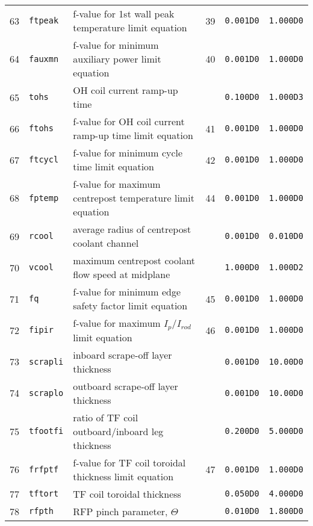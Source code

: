 \documentclass[11pt,a4paper]{report}
\begin{document}
\begin{table}[tbph]
\begin{center}
\begin{tabular}{||c|l|l|c|c|c||}
63  & \texttt{ftpeak}   & f-value for 1st wall peak temperature limit equation    & 39  & \texttt{0.001D0} & \texttt{1.000D0} \\
64  & \texttt{fauxmn}   & f-value for minimum auxiliary power limit equation      & 40  & \texttt{0.001D0} & \texttt{1.000D0} \\
65  & \texttt{tohs}     & OH coil current ramp-up time                            &     & \texttt{0.100D0} & \texttt{1.000D3} \\
66  & \texttt{ftohs}    & f-value for OH coil current ramp-up time limit equation & 41  & \texttt{0.001D0} & \texttt{1.000D0} \\
67  & \texttt{ftcycl}   & f-value for minimum cycle time limit equation           & 42  & \texttt{0.001D0} & \texttt{1.000D0} \\
68  & \texttt{fptemp}   & f-value for maximum centrepost temperature limit equation & 44  & \texttt{0.001D0} & \texttt{1.000D0} \\
69  & \texttt{rcool}    & average radius of centrepost coolant channel            &     & \texttt{0.001D0} & \texttt{0.010D0} \\
70  & \texttt{vcool}    & maximum centrepost coolant flow speed at midplane       &     & \texttt{1.000D0} & \texttt{1.000D2} \\
71  & \texttt{fq}       & f-value for minimum edge safety factor limit equation   & 45  & \texttt{0.001D0} & \texttt{1.000D0} \\
72  & \texttt{fipir}    & f-value for maximum $I_p/I_{rod}$ limit equation         & 46  & \texttt{0.001D0} & \texttt{1.000D0} \\
73  & \texttt{scrapli}  & inboard scrape-off layer thickness                      &     & \texttt{0.001D0} & \texttt{10.00D0} \\
74  & \texttt{scraplo}  & outboard scrape-off layer thickness                     &     & \texttt{0.001D0} & \texttt{10.00D0} \\
75  & \texttt{tfootfi}  & ratio of TF coil outboard/inboard leg thickness         &     & \texttt{0.200D0} & \texttt{5.000D0} \\
76  & \texttt{frfptf}   & f-value for TF coil toroidal thickness limit equation   & 47  & \texttt{0.001D0} & \texttt{1.000D0} \\
77  & \texttt{tftort}   & TF coil toroidal thickness                              &     & \texttt{0.050D0} & \texttt{4.000D0} \\
78  & \texttt{rfpth}    & RFP pinch parameter, $\Theta$                           &     & \texttt{0.010D0} & \texttt{1.800D0} \\

\end{tabular}
\end{center}
\end{table}
\end{document}
